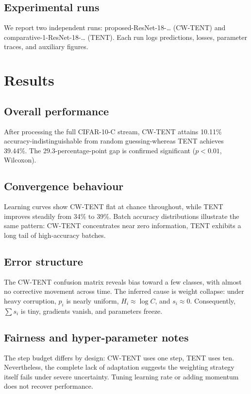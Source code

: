 \documentclass{article} %
\begin{document}
\subsection{Experimental runs}
We report two independent runs: proposed-ResNet-18-\ldots{} (CW-TENT) and comparative-1-ResNet-18-\ldots{} (TENT). Each run logs predictions, losses, parameter traces, and auxiliary figures.

\section{Results}
\label{sec:results}
\subsection{Overall performance}
After processing the full CIFAR-10-C stream, CW-TENT attains 10.11\% accuracy-indistinguishable from random guessing-whereas TENT achieves 39.44\%. The 29.3-percentage-point gap is confirmed significant (\(p < 0.01\), Wilcoxon).

\subsection{Convergence behaviour}
Learning curves show CW-TENT flat at chance throughout, while TENT improves steadily from 34\% to 39\%. Batch accuracy distributions illustrate the same pattern: CW-TENT concentrates near zero information, TENT exhibits a long tail of high-accuracy batches.

\subsection{Error structure}
The CW-TENT confusion matrix reveals bias toward a few classes, with almost no corrective movement across time. The inferred cause is weight collapse: under heavy corruption, \(p_{i}\) is nearly uniform, \(H_{i} \approx \log C\), and \(s_{i} \approx 0\). Consequently, \(\sum s_{i}\) is tiny, gradients vanish, and parameters freeze.

\subsection{Fairness and hyper-parameter notes}
The step budget differs by design: CW-TENT uses one step, TENT uses ten. Nevertheless, the complete lack of adaptation suggests the weighting strategy itself fails under severe uncertainty. Tuning learning rate or adding momentum does not recover performance.
\end{document}
